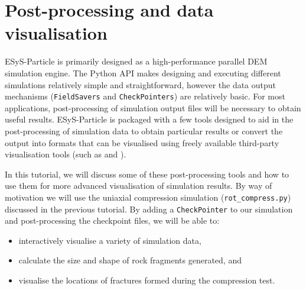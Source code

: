 
\newpage
\section{Post-processing and data visualisation}
\label{sec:postprocessing}
ESyS-Particle is primarily designed as a high-performance parallel DEM simulation engine. The Python API makes designing and executing different simulations relatively simple and straightforward, however the data output mechanisms (\texttt{FieldSavers} and \texttt{CheckPointers}) are relatively basic. For most applications, post-processing of simulation output files will be necessary to obtain useful results. ESyS-Particle is packaged with a few tools designed to aid in the post-processing of simulation data to obtain particular results or convert the output into formats that can be visualised using freely available third-party visualisation tools (such as  and ). 

In this tutorial, we will discuss some of these post-processing tools and how to use them for more advanced visualisation of simulation results. By way of motivation we will use the uniaxial compression simulation (\texttt{rot\_compress.py}) discussed in the previous tutorial. By adding a \texttt{CheckPointer} to our simulation and post-processing the checkpoint files, we will be able to:
\begin{itemize}
\item interactively visualise a variety of simulation data, 
\item calculate the size and shape of rock fragments generated, and 
\item visualise the locations of fractures formed during the compression test.
\end{itemize}

